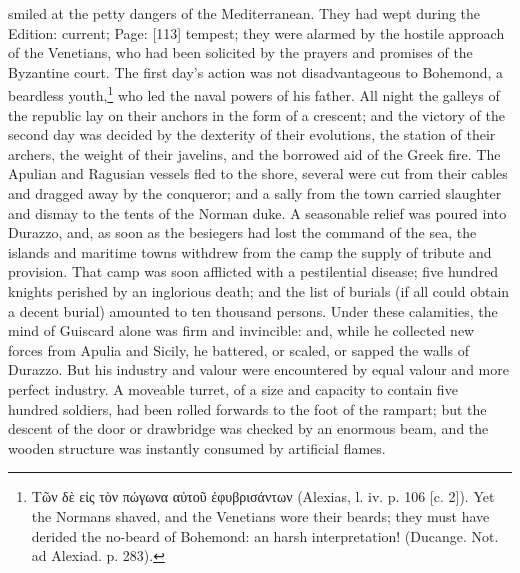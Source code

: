 smiled at the petty dangers of the Mediterranean. They had wept during the Edition: current; Page: [113] tempest; they were alarmed by the hostile approach of the Venetians, who had been solicited by the prayers and promises of the Byzantine court. The first day\texthebrew{}’s action was not disadvantageous to Bohemond, a beardless youth,\footnote{\textgreek{Τ\texthebrew{ῶ}ν δ\texthebrew{ὲ} ε\texthebrew{ἰ}ς τ\texthebrew{ὸ}ν πώγωνα α\texthebrew{ὐ}το\texthebrew{ῦ ἐ}φυβρισάντων} (Alexias, l. iv. p. 106 [c. 2]). Yet the Normans shaved, and the Venetians wore their beards; they must have derided the no-beard of Bohemond: an harsh interpretation! (Ducange. Not. ad Alexiad. p. 283).} who led the naval powers of his father. All night the galleys of the republic lay on their anchors in the form of a crescent; and the victory of the second day was decided by the dexterity of their evolutions, the station of their archers, the weight of their javelins, and the borrowed aid of the Greek fire. The Apulian and Ragusian vessels fled to the shore, several were cut from their cables and dragged away by the conqueror; and a sally from the town carried slaughter and dismay to the tents of the Norman duke. A seasonable relief was poured into Durazzo, and, as soon as the besiegers had lost the command of the sea, the islands and maritime towns withdrew from the camp the supply of tribute and provision. That camp was soon afflicted with a pestilential disease; five hundred knights perished by an inglorious death; and the list of burials (if all could obtain a decent burial) amounted to ten thousand persons. Under these calamities, the mind of Guiscard alone was firm and invincible: and, while he collected new forces from Apulia and Sicily, he battered, or scaled, or sapped the walls of Durazzo. But his industry and valour were encountered by equal valour and more perfect industry. A moveable turret, of a size and capacity to contain five hundred soldiers, had been rolled forwards to the foot of the rampart; but the descent of the door or drawbridge was checked by an enormous beam, and the wooden structure was instantly consumed by artificial flames.

